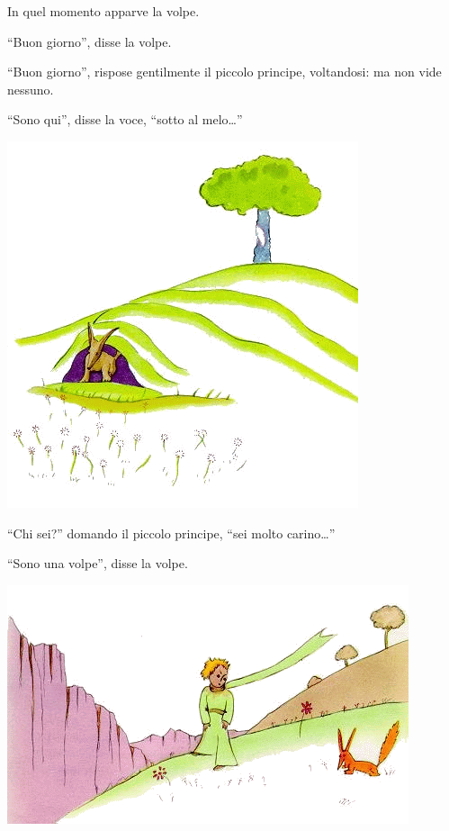 \documentclass[11pt]{scrbook}
\begin{document}
In quel momento apparve la volpe.

``Buon giorno'', disse la volpe.

``Buon giorno'', rispose gentilmente il piccolo principe, voltandosi: ma
non vide nessuno.

``Sono qui'', disse la voce, ``sotto al melo\ldots{}''

\begin{center}
\includegraphics{./img/21b.png}
\end{center}

``Chi sei?'' domando il piccolo principe, ``sei molto carino\ldots{}''

``Sono una volpe'', disse la volpe.

\begin{center}
\includegraphics{./img/21a.png}
\end{center}
\end{document}
